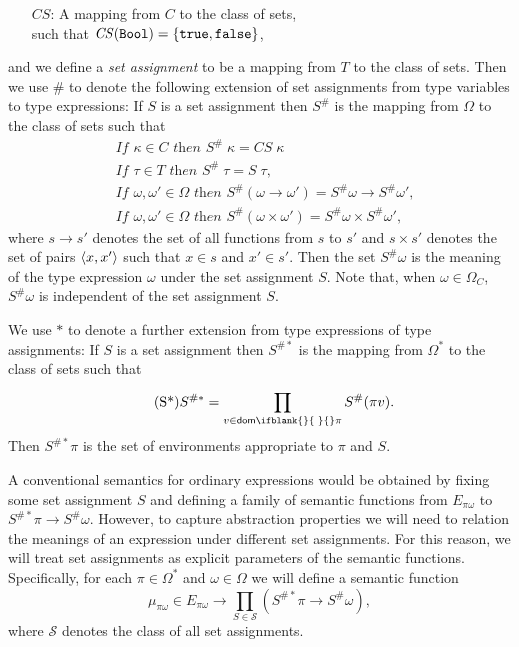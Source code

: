 \documentclass[sigplan,screen,nonacm,balance=false]{acmart}
\theoremstyle{plain}
\DeclarePairedDelimiter{\set}{\{}{\}}
\DeclarePairedDelimiter{\pair}{\langle}{\rangle}
\newcommand{\Bool}{\mathtt{Bool}}
\newcommand{\true}{\mathtt{true}}
\newcommand{\false}{\mathtt{false}}
\newcommand{\dom}[1]{\mathsf{dom}\ifblank{#1}{\;}{#1}}
\newcommand{\CS}{\mathit{CS}}
\begin{document}
\begin{itemize}[noitemsep,leftmargin=3em]
  \item[$\CS$:] A mapping from $C$ to the class of sets, \\
  such that $\CS(\Bool) = \set{\true, \false}$,
\end{itemize}
%
and we define a \emph{set assignment} to be a mapping from $T$ to the class of sets.
Then we use $\#$ to denote the following extension of set assignments from type variables to type expressions:
If $S$ is a set assignment then $S^\#$ is the mapping from $\Omega$ to the class of sets such that
%
\begin{align}
  \tag{S1}
  &\textit{If } \kappa \in C \textit{ then } S^\# \; \kappa = \CS \; \kappa \\
  \tag{S2}
  &\textit{If } \tau \in T \textit{ then } S^\# \; \tau = S \; \tau, \\
  \tag{S3}
  &\textit{If } \omega, \omega' \in \Omega \textit{ then } S^\# (\omega \to \omega') = S^\# \omega \to S^\# \omega', \\
  \tag{S4}\label{S4}
  &\textit{If } \omega, \omega' \in \Omega \textit{ then } S^\#(\omega \times \omega') = S^\# \omega \times S^\# \omega',
\end{align}
%
where $s \to s'$ denotes the set of all functions from $s$ to $s'$ and $s \times s'$ denotes the set of pairs $\pair{x, x'}$ such that $x \in s$ and $x' \in s'$.
Then the set $S^\# \omega$ is the meaning of the type expression $\omega$ under the set assignment $S$.
Note that, when $\omega \in \Omega_C$, $S^\# \omega$ is independent of the set assignment $S$.

We use $*$ to denote a further extension from type expressions of type assignments:
If $S$ is a set assignment then $S^{\#*}$ is the mapping from $\Omega^*$ to the class of sets such that
%
\begin{equation}\tag{S*}\label{S-star}
  S^{\#*} = \prod_{v \in \dom{} \pi}^{} S^\#(\pi v).
\end{equation}
%
Then $S^{\#*} \pi$ is the set of environments appropriate to $\pi$ and $S$.

A conventional semantics for ordinary expressions would be obtained by fixing some set assignment $S$ and defining a family of semantic functions from $E_{\pi \omega}$ to $S^{\#*} \pi \to S^{\#} \omega$.
However, to capture abstraction properties we will need to relation the meanings of an expression under different set assignments.
For this reason, we will treat set assignments as explicit parameters of the semantic functions.
Specifically, for each $\pi \in \Omega^*$ and $\omega \in \Omega$ we will define a semantic function
%
\begin{equation*}
  \mu_{\pi \omega} \in E_{\pi \omega} \to \prod_{S \in \mathcal{S}} (S^{\#*} \pi \to S^\# \omega),
\end{equation*}
%
where $\mathcal{S}$ denotes the class of all set assignments.
\end{document}
